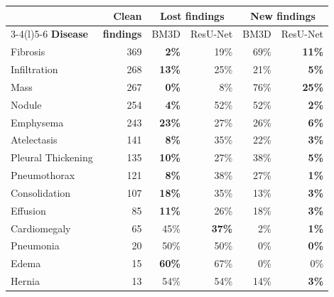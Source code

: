 \begin{tabular}{@{}lrrrrr@{}}
\toprule
& \textbf{Clean} & \multicolumn{2}{c}{\textbf{Lost findings}} & \multicolumn{2}{c}{\textbf{New findings}} \\
\cmidrule(lr){3-4}\cmidrule(l){5-6}
\textbf{Disease} & \textbf{findings} & BM3D & ResU-Net & BM3D & ResU-Net \\
\midrule
Fibrosis & 369 & \textbf{2\%} & 19\% & 69\% & \textbf{11\%} \\
Infiltration & 268 & \textbf{13\%} & 25\% & 21\% & \textbf{5\%} \\
Mass & 267 & \textbf{0\%} & 8\% & 76\% & \textbf{25\%} \\
Nodule & 254 & \textbf{4\%} & 52\% & 52\% & \textbf{2\%} \\
Emphysema & 243 & \textbf{23\%} & 27\% & 26\% & \textbf{6\%} \\
Atelectasis & 141 & \textbf{8\%} & 35\% & 22\% & \textbf{3\%} \\
Pleural Thickening & 135 & \textbf{10\%} & 27\% & 38\% & \textbf{5\%} \\
Pneumothorax & 121 & \textbf{8\%} & 38\% & 27\% & \textbf{1\%} \\
Consolidation & 107 & \textbf{18\%} & 35\% & 13\% & \textbf{3\%} \\
Effusion & 85 & \textbf{11\%} & 26\% & 18\% & \textbf{3\%} \\
Cardiomegaly & 65 & 45\% & \textbf{37\%} & 2\% & \textbf{1\%} \\
Pneumonia & 20 & 50\% & 50\% & 0\% & \textbf{0\%} \\
Edema & 15 & \textbf{60\%} & 67\% & 0\% & 0\% \\
Hernia & 13 & 54\% & 54\% & 14\% & \textbf{3\%} \\
\bottomrule
\end{tabular}
